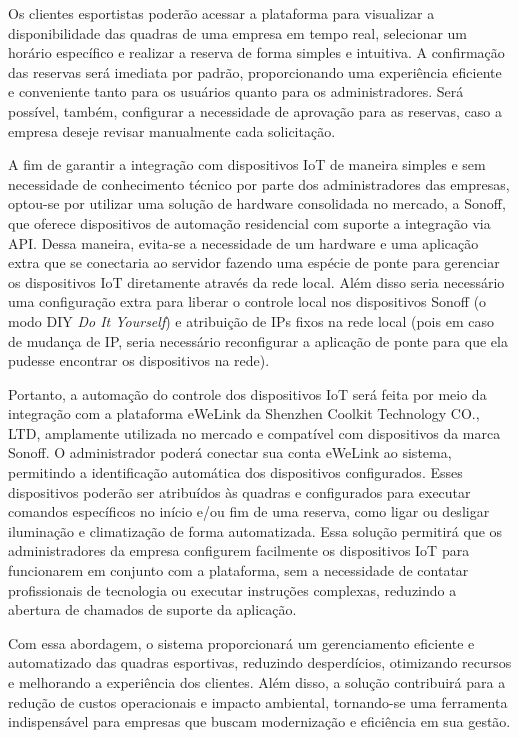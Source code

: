 Os clientes esportistas poderão acessar a plataforma para visualizar a disponibilidade das quadras de uma empresa em tempo real, selecionar um horário específico e realizar a reserva de forma simples e intuitiva. A confirmação das reservas será imediata por padrão, proporcionando uma experiência eficiente e conveniente tanto para os usuários quanto para os administradores. Será possível, também, configurar a necessidade de aprovação para as reservas, caso a empresa deseje revisar manualmente cada solicitação.

A fim de garantir a integração com dispositivos IoT de maneira simples e sem necessidade de conhecimento técnico por parte dos administradores das empresas, optou-se por utilizar uma solução de hardware consolidada no mercado, a Sonoff, que oferece dispositivos de automação residencial com suporte a integração via API. Dessa maneira, evita-se a necessidade de um hardware e uma aplicação extra que se conectaria ao servidor fazendo uma espécie de ponte para gerenciar os dispositivos IoT diretamente através da rede local. Além disso seria necessário uma configuração extra para liberar o controle local nos dispositivos Sonoff (o modo DIY \textit{Do It Yourself}) e atribuição de IPs fixos na rede local (pois em caso de mudança de IP, seria necessário reconfigurar a aplicação de ponte para que ela pudesse encontrar os dispositivos na rede).

Portanto, a automação do controle dos dispositivos IoT será feita por meio da integração com a plataforma eWeLink da Shenzhen Coolkit Technology CO., LTD, amplamente utilizada no mercado e compatível com dispositivos da marca Sonoff. O administrador poderá conectar sua conta eWeLink ao sistema, permitindo a identificação automática dos dispositivos configurados. Esses dispositivos poderão ser atribuídos às quadras e configurados para executar comandos específicos no início e/ou fim de uma reserva, como ligar ou desligar iluminação e climatização de forma automatizada. Essa solução permitirá que os administradores da empresa configurem facilmente os dispositivos IoT para funcionarem em conjunto com a plataforma, sem a necessidade de contatar profissionais de tecnologia ou executar instruções complexas, reduzindo a abertura de chamados de suporte da aplicação.

Com essa abordagem, o sistema proporcionará um gerenciamento eficiente e automatizado das quadras esportivas, reduzindo desperdícios, otimizando recursos e melhorando a experiência dos clientes. Além disso, a solução contribuirá para a redução de custos operacionais e impacto ambiental, tornando-se uma ferramenta indispensável para empresas que buscam modernização e eficiência em sua gestão.

